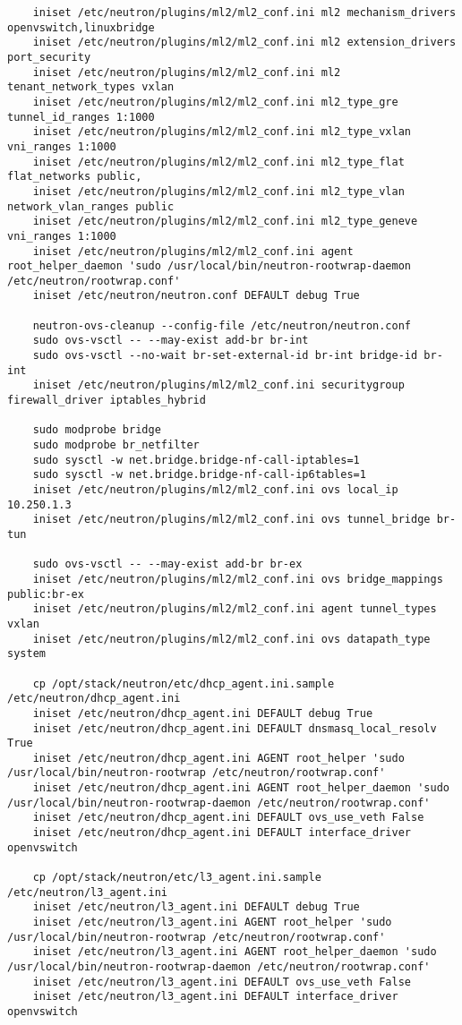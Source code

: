 \documentclass[a4paper,left=1.5cm,right=1.5cm,11pt]{article}
\begin{document}
\begin{lstlisting}
	iniset /etc/neutron/plugins/ml2/ml2_conf.ini ml2 mechanism_drivers openvswitch,linuxbridge
	iniset /etc/neutron/plugins/ml2/ml2_conf.ini ml2 extension_drivers port_security
	iniset /etc/neutron/plugins/ml2/ml2_conf.ini ml2 tenant_network_types vxlan
	iniset /etc/neutron/plugins/ml2/ml2_conf.ini ml2_type_gre tunnel_id_ranges 1:1000
	iniset /etc/neutron/plugins/ml2/ml2_conf.ini ml2_type_vxlan vni_ranges 1:1000
	iniset /etc/neutron/plugins/ml2/ml2_conf.ini ml2_type_flat flat_networks public,
	iniset /etc/neutron/plugins/ml2/ml2_conf.ini ml2_type_vlan network_vlan_ranges public
	iniset /etc/neutron/plugins/ml2/ml2_conf.ini ml2_type_geneve vni_ranges 1:1000
	iniset /etc/neutron/plugins/ml2/ml2_conf.ini agent root_helper_daemon 'sudo /usr/local/bin/neutron-rootwrap-daemon /etc/neutron/rootwrap.conf'
	iniset /etc/neutron/neutron.conf DEFAULT debug True

	neutron-ovs-cleanup --config-file /etc/neutron/neutron.conf
	sudo ovs-vsctl -- --may-exist add-br br-int
	sudo ovs-vsctl --no-wait br-set-external-id br-int bridge-id br-int
	iniset /etc/neutron/plugins/ml2/ml2_conf.ini securitygroup firewall_driver iptables_hybrid
	
	sudo modprobe bridge
	sudo modprobe br_netfilter
	sudo sysctl -w net.bridge.bridge-nf-call-iptables=1
	sudo sysctl -w net.bridge.bridge-nf-call-ip6tables=1
	iniset /etc/neutron/plugins/ml2/ml2_conf.ini ovs local_ip 10.250.1.3
	iniset /etc/neutron/plugins/ml2/ml2_conf.ini ovs tunnel_bridge br-tun

	sudo ovs-vsctl -- --may-exist add-br br-ex
	iniset /etc/neutron/plugins/ml2/ml2_conf.ini ovs bridge_mappings public:br-ex
	iniset /etc/neutron/plugins/ml2/ml2_conf.ini agent tunnel_types vxlan
	iniset /etc/neutron/plugins/ml2/ml2_conf.ini ovs datapath_type system

	cp /opt/stack/neutron/etc/dhcp_agent.ini.sample /etc/neutron/dhcp_agent.ini
	iniset /etc/neutron/dhcp_agent.ini DEFAULT debug True
	iniset /etc/neutron/dhcp_agent.ini DEFAULT dnsmasq_local_resolv True
	iniset /etc/neutron/dhcp_agent.ini AGENT root_helper 'sudo /usr/local/bin/neutron-rootwrap /etc/neutron/rootwrap.conf'
	iniset /etc/neutron/dhcp_agent.ini AGENT root_helper_daemon 'sudo /usr/local/bin/neutron-rootwrap-daemon /etc/neutron/rootwrap.conf'
	iniset /etc/neutron/dhcp_agent.ini DEFAULT ovs_use_veth False
	iniset /etc/neutron/dhcp_agent.ini DEFAULT interface_driver openvswitch

	cp /opt/stack/neutron/etc/l3_agent.ini.sample /etc/neutron/l3_agent.ini
	iniset /etc/neutron/l3_agent.ini DEFAULT debug True
	iniset /etc/neutron/l3_agent.ini AGENT root_helper 'sudo /usr/local/bin/neutron-rootwrap /etc/neutron/rootwrap.conf'
	iniset /etc/neutron/l3_agent.ini AGENT root_helper_daemon 'sudo /usr/local/bin/neutron-rootwrap-daemon /etc/neutron/rootwrap.conf'
	iniset /etc/neutron/l3_agent.ini DEFAULT ovs_use_veth False
	iniset /etc/neutron/l3_agent.ini DEFAULT interface_driver openvswitch


\end{lstlisting}
\end{document}
